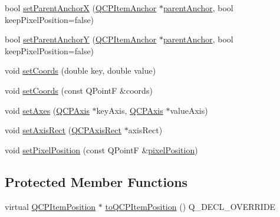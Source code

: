 \begin{DoxyCompactItemize}
\item 
bool \mbox{\hyperlink{class_q_c_p_item_position_add71461a973927c74e42179480916d9c}{set\+Parent\+AnchorX}} (\mbox{\hyperlink{class_q_c_p_item_anchor}{Q\+C\+P\+Item\+Anchor}} $\ast$\mbox{\hyperlink{class_q_c_p_item_position_a0a87f9dce1af6cc9b510785991bcf1c6}{parent\+Anchor}}, bool keep\+Pixel\+Position=false)
\item 
bool \mbox{\hyperlink{class_q_c_p_item_position_add5ec1db9d19cec58a3b5c9e0a0c3f9d}{set\+Parent\+AnchorY}} (\mbox{\hyperlink{class_q_c_p_item_anchor}{Q\+C\+P\+Item\+Anchor}} $\ast$\mbox{\hyperlink{class_q_c_p_item_position_a0a87f9dce1af6cc9b510785991bcf1c6}{parent\+Anchor}}, bool keep\+Pixel\+Position=false)
\item 
void \mbox{\hyperlink{class_q_c_p_item_position_aa988ba4e87ab684c9021017dcaba945f}{set\+Coords}} (double key, double value)
\item 
void \mbox{\hyperlink{class_q_c_p_item_position_acc70b3abc143287f806e5f154e5e07b0}{set\+Coords}} (const Q\+PointF \&coords)
\item 
void \mbox{\hyperlink{class_q_c_p_item_position_a2185f45c75ac8cb9be89daeaaad50e37}{set\+Axes}} (\mbox{\hyperlink{class_q_c_p_axis}{Q\+C\+P\+Axis}} $\ast$key\+Axis, \mbox{\hyperlink{class_q_c_p_axis}{Q\+C\+P\+Axis}} $\ast$value\+Axis)
\item 
void \mbox{\hyperlink{class_q_c_p_item_position_a0cd9b326fb324710169e92e8ca0041c2}{set\+Axis\+Rect}} (\mbox{\hyperlink{class_q_c_p_axis_rect}{Q\+C\+P\+Axis\+Rect}} $\ast$axis\+Rect)
\item 
void \mbox{\hyperlink{class_q_c_p_item_position_a8d4f858f2089973967cf9cb81970ef0a}{set\+Pixel\+Position}} (const Q\+PointF \&\mbox{\hyperlink{class_q_c_p_item_position_a3b5a12a8e5081c1a5bb878ffdcfa92ad}{pixel\+Position}})
\end{DoxyCompactItemize}
\subsection*{Protected Member Functions}
\begin{DoxyCompactItemize}
\item 
virtual \mbox{\hyperlink{class_q_c_p_item_position}{Q\+C\+P\+Item\+Position}} $\ast$ \mbox{\hyperlink{class_q_c_p_item_position_a008ff9ebe645a963671b68bcf7f7a1c0}{to\+Q\+C\+P\+Item\+Position}} () Q\+\_\+\+D\+E\+C\+L\+\_\+\+O\+V\+E\+R\+R\+I\+DE
\end{DoxyCompactItemize}
